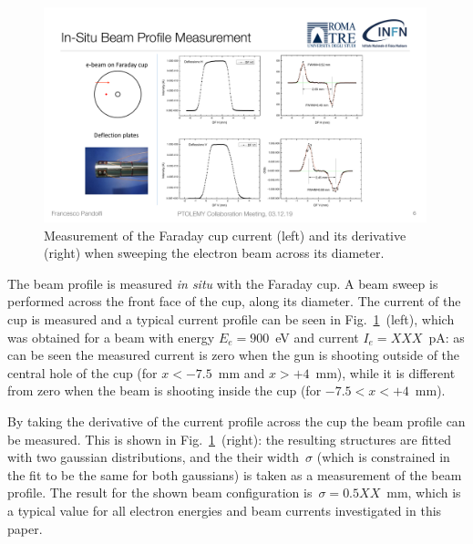 \documentclass[12p]{paper}
\begin{document}
\begin{figure}[tb]
  \centering
\includegraphics[width=0.99\textwidth]{figures/FC_scan.pdf}
 \caption{Measurement of the Faraday cup current (left) and its derivative (right) when sweeping the electron beam across its diameter.
  \label{fig:FC_scan}}
\end{figure}


The beam profile is measured {\em in situ} with the Faraday cup. A beam sweep is performed across the front face of the cup, along its diameter. The current of the cup is measured and a typical current profile can be seen in Fig.~\ref{fig:FC_scan}~(left), which was obtained for a beam with energy $E_e = 900$~eV and current $I_e = XXX$~pA: as can be seen the measured current is zero when the gun is shooting outside of the central hole of the cup (for $x < -7.5$~mm and $x > +4$~mm), while it is different from zero when the beam is shooting inside the cup (for $-7.5 < x < +4$~mm). 

By taking the derivative of the current profile across the cup the beam profile can be measured. This is shown in Fig.~\ref{fig:FC_scan}~(right): the resulting structures are fitted with two gaussian distributions, and the their width~$\sigma$ (which is constrained in the fit to be the same for both gaussians) is taken as a measurement of the beam profile. The result for the shown beam configuration is~$\sigma = 0.5XX$~mm, which is a typical value for all electron energies and beam currents investigated in this paper.  
\end{document}
